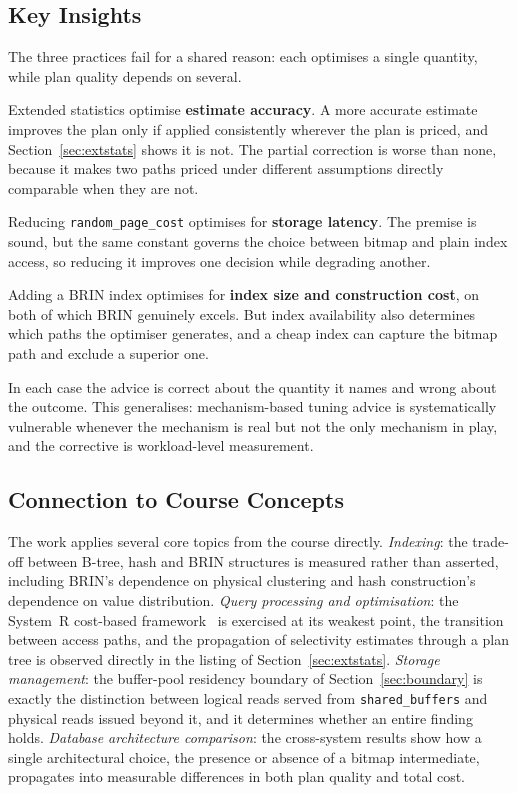 \documentclass[12pt, a4paper]{article}
\newcommand{\rpc}{\texttt{random\_page\_cost}}
\newcommand{\sbuf}{\texttt{shared\_buffers}}
\begin{document}
\subsection{Key Insights}

The three practices fail for a shared reason: each optimises a single
quantity, while plan quality depends on several.

Extended statistics optimise \textbf{estimate accuracy}. A more accurate
estimate improves the plan only if applied consistently wherever the
plan is priced, and Section~\ref{sec:extstats} shows it is not. The
partial correction is worse than none, because it makes two paths priced
under different assumptions directly comparable when they are not.

Reducing \rpc{} optimises for \textbf{storage latency}. The premise is
sound, but the same constant governs the choice between bitmap and plain
index access, so reducing it improves one decision while degrading
another.

Adding a BRIN index optimises for \textbf{index size and construction
cost}, on both of which BRIN genuinely excels. But index availability
also determines which paths the optimiser generates, and a cheap index
can capture the bitmap path and exclude a superior one.

In each case the advice is correct about the quantity it names and wrong
about the outcome. This generalises: mechanism-based tuning advice is
systematically vulnerable whenever the mechanism is real but not the
only mechanism in play, and the corrective is workload-level
measurement.

\subsection{Connection to Course Concepts}

The work applies several core topics from the course directly.
\emph{Indexing}: the trade-off between B-tree, hash and BRIN structures
is measured rather than asserted, including BRIN's dependence on
physical clustering and hash construction's dependence on value
distribution. \emph{Query processing and optimisation}: the System~R
cost-based framework~\cite{selinger1979access} is exercised at its
weakest point, the transition between access paths, and the propagation
of selectivity estimates through a plan tree is observed directly in the
listing of Section~\ref{sec:extstats}. \emph{Storage management}: the
buffer-pool residency boundary of Section~\ref{sec:boundary} is exactly
the distinction between logical reads served from \sbuf{} and physical
reads issued beyond it, and it determines whether an entire finding
holds. \emph{Database architecture comparison}: the cross-system results
show how a single architectural choice, the presence or absence of a
bitmap intermediate, propagates into measurable differences in both
plan quality and total cost.
\end{document}
